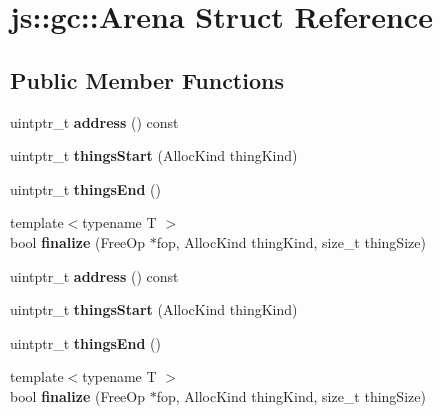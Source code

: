 \hypertarget{structjs_1_1gc_1_1_arena}{\section{js\-:\-:gc\-:\-:Arena Struct Reference}
\label{structjs_1_1gc_1_1_arena}
}
\subsection*{Public Member Functions}
\begin{DoxyCompactItemize}
\item 
\hypertarget{structjs_1_1gc_1_1_arena_ac720e69283ff4fd594e912814b2f7baf}{uintptr\-\_\-t {\bfseries address} () const }\label{structjs_1_1gc_1_1_arena_ac720e69283ff4fd594e912814b2f7baf}

\item 
\hypertarget{structjs_1_1gc_1_1_arena_a6982af5dd5cf36d217c1e9774e809a2e}{uintptr\-\_\-t {\bfseries things\-Start} (Alloc\-Kind thing\-Kind)}\label{structjs_1_1gc_1_1_arena_a6982af5dd5cf36d217c1e9774e809a2e}

\item 
\hypertarget{structjs_1_1gc_1_1_arena_a218d14cbb19d2ea5d4559cae260629cd}{uintptr\-\_\-t {\bfseries things\-End} ()}\label{structjs_1_1gc_1_1_arena_a218d14cbb19d2ea5d4559cae260629cd}

\item 
\hypertarget{structjs_1_1gc_1_1_arena_a7f10f1b1c9e16b890f67f96abd424cd2}{{\footnotesize template$<$typename T $>$ }\\bool {\bfseries finalize} (Free\-Op $\ast$fop, Alloc\-Kind thing\-Kind, size\-\_\-t thing\-Size)}\label{structjs_1_1gc_1_1_arena_a7f10f1b1c9e16b890f67f96abd424cd2}

\item 
\hypertarget{structjs_1_1gc_1_1_arena_ac720e69283ff4fd594e912814b2f7baf}{uintptr\-\_\-t {\bfseries address} () const }\label{structjs_1_1gc_1_1_arena_ac720e69283ff4fd594e912814b2f7baf}

\item 
\hypertarget{structjs_1_1gc_1_1_arena_a6982af5dd5cf36d217c1e9774e809a2e}{uintptr\-\_\-t {\bfseries things\-Start} (Alloc\-Kind thing\-Kind)}\label{structjs_1_1gc_1_1_arena_a6982af5dd5cf36d217c1e9774e809a2e}

\item 
\hypertarget{structjs_1_1gc_1_1_arena_a218d14cbb19d2ea5d4559cae260629cd}{uintptr\-\_\-t {\bfseries things\-End} ()}\label{structjs_1_1gc_1_1_arena_a218d14cbb19d2ea5d4559cae260629cd}

\item 
\hypertarget{structjs_1_1gc_1_1_arena_a7f10f1b1c9e16b890f67f96abd424cd2}{{\footnotesize template$<$typename T $>$ }\\bool {\bfseries finalize} (Free\-Op $\ast$fop, Alloc\-Kind thing\-Kind, size\-\_\-t thing\-Size)}\label{structjs_1_1gc_1_1_arena_a7f10f1b1c9e16b890f67f96abd424cd2}

\end{DoxyCompactItemize}
